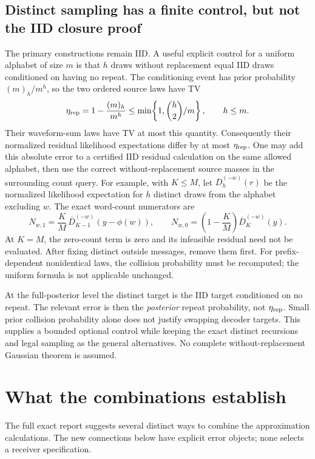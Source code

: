 \documentclass[10pt,a4paper]{article}
\begin{document}
\subsection{Distinct sampling has a finite control, but not the IID closure proof}
The primary constructions remain IID. A useful explicit control for a uniform alphabet of size $m$
is that $h$ draws without replacement equal IID draws conditioned on having no repeat. The conditioning
event has prior probability $(m)_h/m^h$, so the two ordered source laws have TV
\[
 \eta_{\rm rep}=1-\frac{(m)_h}{m^h}
 \leq\min\!\left\{1,\binom h2/m\right\},\qquad h\leq m.
\]
Their waveform-sum laws have TV at most this quantity. Consequently their normalized residual likelihood
expectations differ by at most $\eta_{\rm rep}$.
One may add this absolute error to a certified IID residual calculation on the same allowed alphabet,
then use the correct without-replacement source masses in the surrounding count query.
For example, with $K\leq M$, let $\overline D_h^{(-w)}(r)$ be the normalized likelihood expectation for
$h$ distinct draws from the alphabet excluding $w$. The exact word-count numerators are
\[
 N_{w,1}=\frac KM\,\overline D_{K-1}^{(-w)}(y-\phi(w)),\qquad
 N_{w,0}=\left(1-\frac KM\right)\overline D_K^{(-w)}(y).
\]
At $K=M$, the zero-count term is zero and its infeasible residual need not be evaluated.
After fixing distinct outside messages, remove them first. For prefix-dependent nonidentical laws,
the collision probability must be recomputed; the uniform formula is not applicable unchanged.

At the full-posterior level the distinct target is the IID target conditioned on no repeat.
The relevant error is then the \emph{posterior} repeat probability, not $\eta_{\rm rep}$.
Small prior collision probability alone does not justify swapping decoder targets.
This supplies a bounded optional control while keeping the exact distinct recursions and legal sampling
as the general alternatives. No complete without-replacement Gaussian theorem is assumed.

\clearpage
\section{What the combinations establish}
\label{sec:continuing-combinations}
The full exact report suggests several distinct ways to combine the approximation calculations.
The new connections below have explicit error objects; none selects a receiver specification.
\end{document}
